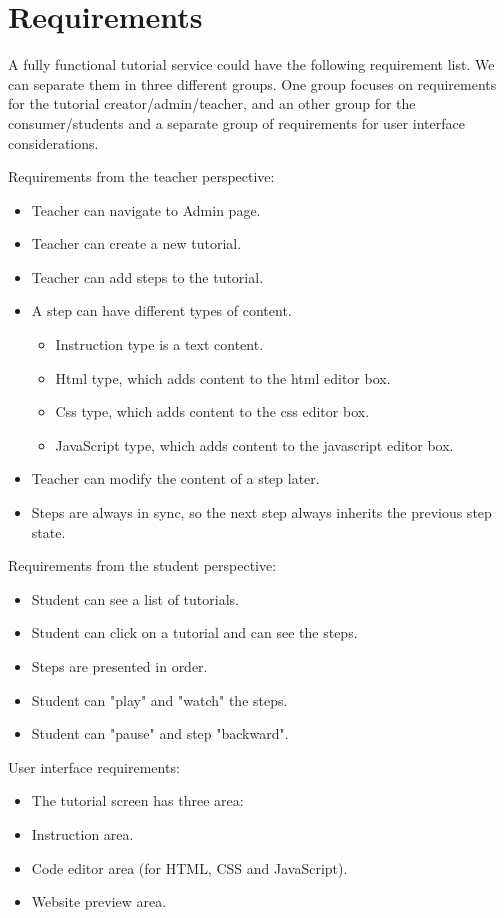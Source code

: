 \documentclass[12pt, a4paper, oneside, openright, medskipamount]{report}
\begin{document}
\section{Requirements}

A fully functional tutorial service could have the following requirement list. We can separate them in three different groups. One group focuses on requirements for the tutorial creator/admin/teacher, and an other group for the consumer/students and a separate group of requirements for user interface considerations.

\noindent Requirements from the teacher perspective:
\begin{itemize}[noitemsep]
\item Teacher can navigate to Admin page.
\item Teacher can create a new tutorial.
\item Teacher can add steps to the tutorial.
\item A step can have different types of content.
\begin{itemize}[noitemsep]
\item Instruction type is a text content.
\item Html type, which adds content to the html editor box.
\item Css type, which adds content to the css editor box.
\item JavaScript type, which adds content to the javascript editor box.
\end{itemize}
\item Teacher can modify the content of a step later.
\item Steps are always in sync, so the next step always inherits the previous step state.
\end{itemize}

\noindent Requirements from the student perspective:
\begin{itemize}[noitemsep]
\item Student can see a list of tutorials.
\item Student can click on a tutorial and can see the steps.
\item Steps are presented in order.
\item Student can "play" and "watch" the steps.
\item Student can "pause" and step "backward".
\end{itemize}

\noindent User interface requirements:
\begin{itemize}[noitemsep]
\item The tutorial screen has three area:
\item Instruction area.
\item Code editor area (for HTML, CSS and JavaScript).
\item Website preview area.
\end{itemize}
\end{document}
